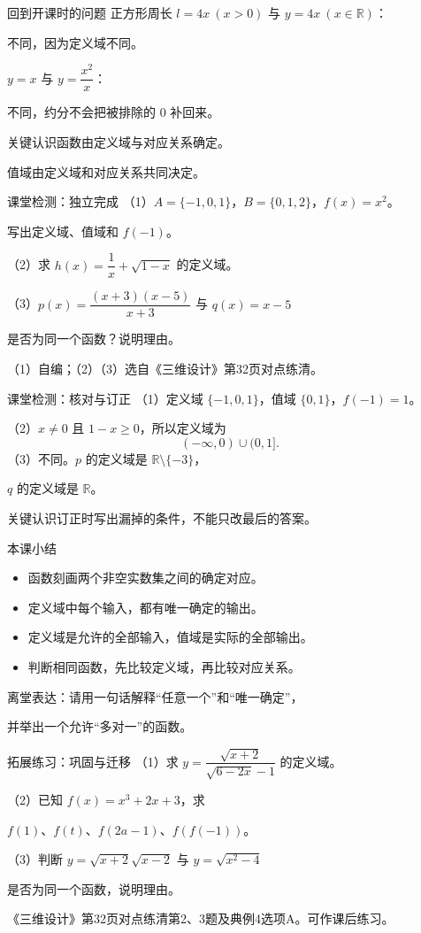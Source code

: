 \documentclass[aspectratio=169,10pt]{beamer}
\newcommand{\R}{\mathbb R}
\newcommand{\src}[1]{\par\vfill{\tiny\color{gray}#1}}
\newcommand{\key}[1]{\begin{block}{关键认识}#1\end{block}}
\begin{document}
\begin{frame}[t]{回到开课时的问题}
正方形周长 $l=4x\ (x>0)$ 与 $y=4x\ (x\in\R)$：\par
\alert{不同}，因为定义域不同。\par\bigskip
$y=x$ 与 $y=\dfrac{x^2}{x}$：\par
\alert{不同}，约分不会把被排除的 $0$ 补回来。
\key{函数由定义域与对应关系确定。\par
值域由定义域和对应关系共同决定。}
\end{frame}
\begin{frame}[t]{课堂检测：独立完成}
（1）$A=\{-1,0,1\}$，$B=\{0,1,2\}$，$f(x)=x^2$。\par
写出定义域、值域和 $f(-1)$。\par\medskip
（2）求 $h(x)=\dfrac1x+\sqrt{1-x}$ 的定义域。\par\medskip
（3）$p(x)=\dfrac{(x+3)(x-5)}{x+3}$ 与 $q(x)=x-5$\par
是否为同一个函数？说明理由。
\src{（1）自编；（2）（3）选自《三维设计》第32页对点练清。}
\end{frame}
\begin{frame}[t]{课堂检测：核对与订正}
（1）定义域 $\{-1,0,1\}$，值域 $\{0,1\}$，$f(-1)=1$。\par\bigskip
（2）$x\ne0$ 且 $1-x\ge0$，所以定义域为
\[\boxed{(-\infty,0)\cup(0,1].}\]
（3）不同。$p$ 的定义域是 $\R\setminus\{-3\}$，\par
$q$ 的定义域是 $\R$。
\key{订正时写出漏掉的条件，不能只改最后的答案。}
\end{frame}
\begin{frame}[t]{本课小结}
\begin{itemize}
\item 函数刻画两个非空实数集之间的确定对应。
\item 定义域中每个输入，都有唯一确定的输出。
\item 定义域是允许的全部输入，值域是实际的全部输出。
\item 判断相同函数，先比较定义域，再比较对应关系。
\end{itemize}
\bigskip
离堂表达：请用一句话解释“任意一个”和“唯一确定”，\par
并举出一个允许“多对一”的函数。
\end{frame}
\begin{frame}[t]{拓展练习：巩固与迁移}
（1）求 $y=\dfrac{\sqrt{x+2}}{\sqrt{6-2x}-1}$ 的定义域。\par\medskip
（2）已知 $f(x)=x^3+2x+3$，求\par
\quad $f(1)$、$f(t)$、$f(2a-1)$、$f(f(-1))$。\par\medskip
（3）判断 $y=\sqrt{x+2}\sqrt{x-2}$ 与 $y=\sqrt{x^2-4}$\par
是否为同一个函数，说明理由。
\src{《三维设计》第32页对点练清第2、3题及典例4选项A。可作课后练习。}
\end{frame}
\end{document}
